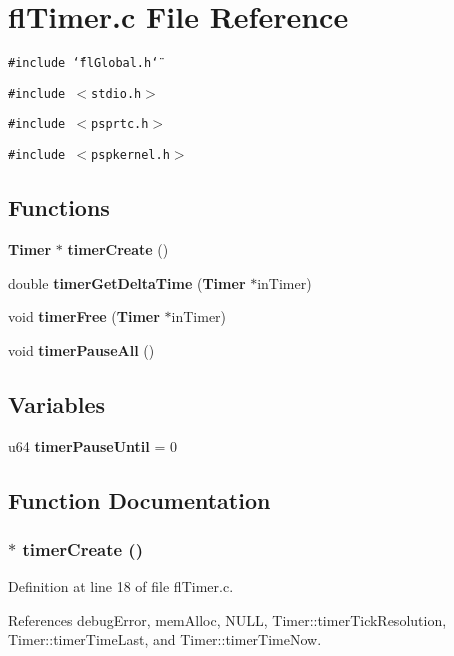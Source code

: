 \section{fl\-Timer.c File Reference}
\label{flTimer_8c}
{\tt \#include \char`\"{}fl\-Global.h\char`\"{}}\par
{\tt \#include $<$stdio.h$>$}\par
{\tt \#include $<$psprtc.h$>$}\par
{\tt \#include $<$pspkernel.h$>$}\par
\subsection*{Functions}
\begin{CompactItemize}
\item 
{\bf Timer} $\ast$ {\bf timer\-Create} ()
\item 
double {\bf timer\-Get\-Delta\-Time} ({\bf Timer} $\ast$in\-Timer)
\item 
void {\bf timer\-Free} ({\bf Timer} $\ast$in\-Timer)
\item 
void {\bf timer\-Pause\-All} ()
\end{CompactItemize}
\subsection*{Variables}
\begin{CompactItemize}
\item 
u64 {\bf timer\-Pause\-Until} = 0
\end{CompactItemize}


\subsection{Function Documentation}
\subsubsection{$\ast$ timer\-Create ()}\label{flTimer_8c_4081033c0b3db3af0897edf915431b73}




Definition at line 18 of file fl\-Timer.c.

References debug\-Error, mem\-Alloc, NULL, Timer::timer\-Tick\-Resolution, Timer::timer\-Time\-Last, and Timer::timer\-Time\-Now.

